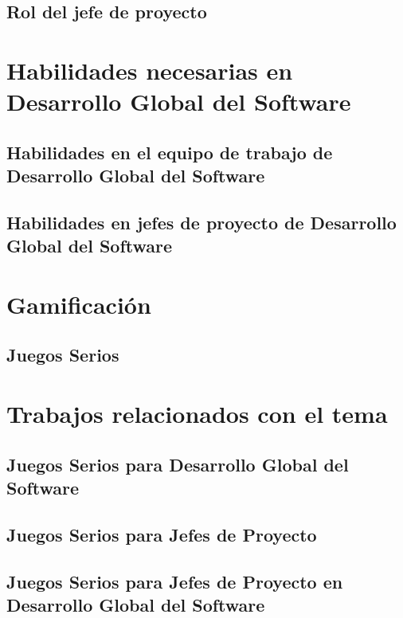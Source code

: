 \subsection{Rol del jefe de proyecto}
\label{sec:ImportanciaJP}

\section{Habilidades necesarias en Desarrollo Global del Software}
\label{sec:HabilidadesDGS}

\subsection{Habilidades en el equipo de trabajo de Desarrollo Global del Software}
\label{sec:HabilidadesT}

\subsection{Habilidades en jefes de proyecto de Desarrollo Global del Software}
\label{sec:HabilidadesJP}

\section{Gamificación}
\label{sec:Gamificacion}

\subsection{Juegos Serios}
\label{sec:JuegosSerios}

\section{Trabajos relacionados con el tema}
\label{sec:TrabajosRelacionados}

\subsection{Juegos Serios para Desarrollo Global del Software}
\label{sec:JuegosSeriosDGS}

\subsection{Juegos Serios para Jefes de Proyecto}
\label{sec:JuegosSeriosJP}

\subsection{Juegos Serios para Jefes de Proyecto en Desarrollo Global del Software}
\label{sec:JuegosSeriosJPDGS}